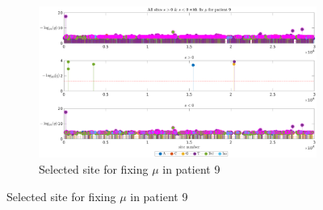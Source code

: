 \documentclass[12pt]{article}
\begin{document}
\begin{figure}[H]
    \ContinuedFloat
    
    
    \begin{subfigure}{0.7\textwidth}
    \hspace{-2.5cm}
            \includegraphics[height=0.5\textheight]{figures/patient/pt9/pt9_siteunder_selection_all_fixmu.eps}
        
        \caption{Selected site for fixing $\mu$ in patient 9}
        \label{fig:subfig3}
    \end{subfigure}
        \end{figure}
\end{document}
